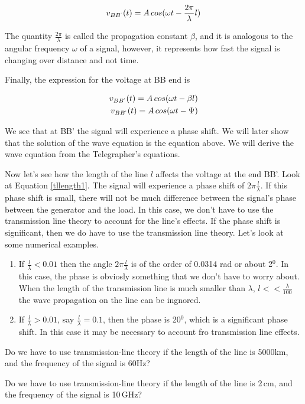 \documentclass{ximera}
\begin{document}
\begin{eqnarray}
v_{BB^`}(t)=A \, cos(\omega t -  \frac{ 2 \pi }{\lambda} l) \label{tllength1}
\end{eqnarray}

The quantity $ \frac{ 2 \pi }{\lambda} $ is called the propagation constant $\beta$, and it is analogous to the angular frequency $\omega$ of a signal, however, it represents how fast the signal is changing over distance and not time.


Finally, the expression for the voltage at BB end is


\begin{eqnarray}
v_{BB^`}(t)=A \, cos(\omega t - \beta l) \\
v_{BB^`}(t)=A \, cos(\omega t - \Psi)
\end{eqnarray}

We see that at BB' the signal will experience a phase shift.
We will later show that the solution of the wave equation is the equation above. We will derive the wave equation   from the Telegrapher's
equations.

Now let's see how the length of the line $l$ affects the voltage at the
end BB'. Look at Equation \ref{tllength1}.
The signal will experience a phase shift of $2\pi \frac{l}{\lambda}$. If this phase shift is small, there will not be much difference between
the signal's phase between the generator and the load. In this case, we don't have to use the transmission line theory to account for the line's effects.
If the phase shift is significant, then we do have to use the transmission line theory. Let's look at some numerical examples.

\begin{enumerate}
\item If $\frac{l}{\lambda} < 0.01$ then the angle $2 \pi
\frac{l}{\lambda}$ is of the order of 0.0314 rad or about 2$^0$. In this case, the
phase is obviosly something that we don't have to worry about. When
the length of the transmission line is much smaller than $\lambda$, $l<<\frac{\lambda}{100}$
the wave propagation on the line can be ingnored.
\item If  $\frac{l}{\lambda} > 0.01$, say  $\frac{l}{\lambda} =0.1$,
then the phase is 20$^0$, which is a significant phase shift. In this
case it may be necessary to account fro transmission line effects.
\end{enumerate}


\begin{question}  
Do we have to use transmission-line theory if the length of the line is 5000km, and the frequency of the signal is 60Hz? 
\begin{multipleChoice}  
\end{multipleChoice}  
\end{question} 



\begin{question}  
Do we have to use transmission-line theory if the length of the line is 2\,cm, and the frequency of the signal is 10\,GHz? 
\begin{multipleChoice}  
\end{multipleChoice}  
\end{question} 
\end{document}
